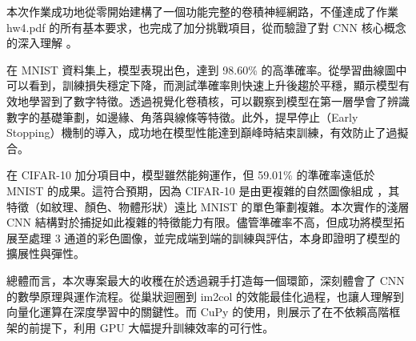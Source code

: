 \documentclass[11pt]{article}
\begin{document}
    本次作業成功地從零開始建構了一個功能完整的卷積神經網路，不僅達成了作業
hw4.pdf 的所有基本要求，也完成了加分挑戰項目，從而驗證了對 CNN
核心概念的深入理解 。

在 MNIST 資料集上，模型表現出色，達到 98.60\%
的高準確率。從學習曲線圖中可以看到，訓練損失穩定下降，而測試準確率則快速上升後趨於平穩，顯示模型有效地學習到了數字特徵。透過視覺化卷積核，可以觀察到模型在第一層學會了辨識數字的基礎筆劃，如邊緣、角落與線條等特徵。此外，提早停止（Early
Stopping）機制的導入，成功地在模型性能達到巔峰時結束訓練，有效防止了過擬合。

在 CIFAR-10 加分項目中，模型雖然能夠運作，但 59.01\% 的準確率遠低於
MNIST 的成果。這符合預期，因為 CIFAR-10 是由更複雜的自然圖像組成
，其特徵（如紋理、顏色、物體形狀）遠比 MNIST
的單色筆劃複雜。本次實作的淺層 CNN
結構對於捕捉如此複雜的特徵能力有限。儘管準確率不高，但成功將模型拓展至處理
3
通道的彩色圖像，並完成端到端的訓練與評估，本身即證明了模型的擴展性與彈性。

總體而言，本次專案最大的收穫在於透過親手打造每一個環節，深刻體會了 CNN
的數學原理與運作流程。從巢狀迴圈到 im2col
的效能最佳化過程，也讓人理解到向量化運算在深度學習中的關鍵性。而 CuPy
的使用，則展示了在不依賴高階框架的前提下，利用 GPU
大幅提升訓練效率的可行性。

    


    
    
    
\end{document}

